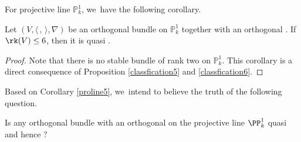 For projective line $\mathbb{P}^1_k$, we~have the following corollary. 
\begin{cor}\label{proline5}
Let $(V,\langle \,, \, \rangle,\nabla)$ be an orthogonal bundle on $\mathbb{P}^1_k$ together with an orthogonal \lconnection. If $\rk(V) \leq 6$, then it is quasi \grsemistable.
\end{cor}

\begin{proof}
Note that there is no stable bundle of rank two on $\mathbb{P}^1_k$. This corollary is a direct consequence of Proposition \ref{classfication5} and \ref{classfication6}.
\end{proof}

Based on Corollary \ref{proline5}, we~intend to believe the truth of the following question.

\begin{ques}
Is any orthogonal bundle with an orthogonal \lconnection on the projective line $\PP^1_k$ quasi \grsemistable and hence \grsemistable?
\end{ques}\label{prolineconj}

